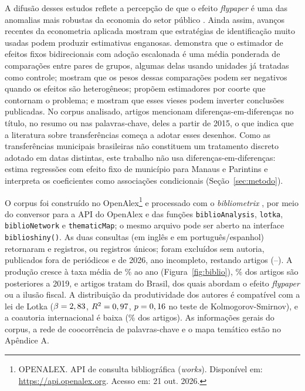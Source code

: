 A difusão desses estudos reflete a percepção de que o efeito \textit{flypaper} é uma das anomalias mais robustas da economia do setor público \cite{hines1995}. Ainda assim, avanços recentes da econometria aplicada mostram que estratégias de identificação muito usadas podem produzir estimativas enganosas.  demonstra que o estimador de efeitos fixos bidirecionais com adoção escalonada é uma média ponderada de comparações entre pares de grupos, algumas delas usando unidades já tratadas como controle;  mostram que os pesos dessas comparações podem ser negativos quando os efeitos são heterogêneos;  propõem estimadores por coorte que contornam o problema; e  mostram que esses vieses podem inverter conclusões publicadas. No corpus analisado, \nDid{} artigos mencionam diferenças-em-diferenças no título, no resumo ou nas palavras-chave, \nDidQuinze{} deles a partir de 2015, o que indica que a literatura sobre transferências começa a adotar esses desenhos. Como as transferências municipais brasileiras não constituem um tratamento discreto adotado em datas distintas, este trabalho não usa diferenças-em-diferenças: estima regressões com efeito fixo de município para Manaus e Parintins e interpreta os coeficientes como associações condicionais (Seção~\ref{sec:metodo}).

O corpus foi construído no OpenAlex\footnote{OPENALEX. API de consulta bibliográfica (\textit{works}). Disponível em: \url{https://api.openalex.org}. Acesso em: 21 out. 2026.} e processado com o \textit{bibliometrix} \cite{aria2017}, por meio do conversor para a API do OpenAlex e das funções \texttt{biblioAnalysis}, \texttt{lotka}, \texttt{biblioNetwork} e \texttt{thematicMap}; o mesmo arquivo pode ser aberto na interface \texttt{biblioshiny()}. As duas consultas (em inglês e em português/espanhol) retornaram \flEn{} e \flPt{} registros, ou \flUnicos{} registros únicos; foram excluídos \flSemAut{} sem autoria, \flNaoPer{} publicados fora de periódicos e \flDoisMilVinteSeis{} de 2026, ano incompleto, restando \flFinal{} artigos (\bibAnoMin--\bibAnoMax). A produção cresce à taxa média de \bibCresc\% ao ano (Figura~\ref{fig:biblio}), \bibPctDesdeVinte\% dos artigos são posteriores a 2019, e \nBrasil{} artigos tratam do Brasil, dos quais \nBrasilFly{} abordam o efeito \textit{flypaper} ou a ilusão fiscal. A distribuição da produtividade dos autores é compatível com a lei de Lotka ($\beta=2,83$, $R^2=0,97$, $p=0,16$ no teste de Kolmogorov-Smirnov), e a coautoria internacional é baixa (\bibIntl\% dos artigos). As informações gerais do corpus, a rede de coocorrência de palavras-chave e o mapa temático estão no Apêndice A.

